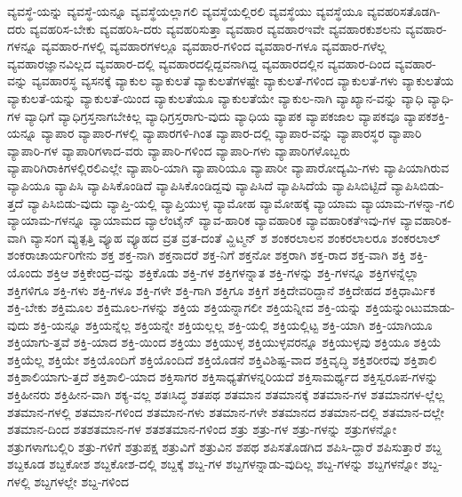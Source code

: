 {ವ್ಯವಸ್ಥೆ-ಯನ್ನು
ವ್ಯವಸ್ಥೆ-ಯನ್ನೂ
ವ್ಯವಸ್ಥೆಯಲ್ಲಾಗಲಿ
ವ್ಯವಸ್ಥೆಯಲ್ಲಿರಲಿ
ವ್ಯವಸ್ಥೆಯು
ವ್ಯವಸ್ಥೆಯೂ
ವ್ಯವಹರಿಸತೊಡಗಿ-ದರು
ವ್ಯವಹರಿಸ-ಬೇಕು
ವ್ಯವಹರಿಸಿ-ದರು
ವ್ಯವಹರಿಸುತ್ತಾ
ವ್ಯವಹಾರ
ವ್ಯವಹಾರಇವೇ
ವ್ಯವಹಾರಕುಶಲನು
ವ್ಯವಹಾರ-ಗಳನ್ನೂ
ವ್ಯವಹಾರ-ಗಳಲ್ಲಿ
ವ್ಯವಹಾರಗಳಲ್ಲೂ
ವ್ಯವಹಾರ-ಗಳಿಂದ
ವ್ಯವಹಾರ-ಗಳೂ
ವ್ಯವಹಾರ-ಗಳೆಲ್ಲ
ವ್ಯವಹಾರಜ್ಞಾನವಿಲ್ಲದ
ವ್ಯವಹಾರ-ದಲ್ಲಿ
ವ್ಯವಹಾರದಲ್ಲಿದ್ದವನಾಗಿದ್ದ
ವ್ಯವಹಾರದಲ್ಲಿನ
ವ್ಯವಹಾರ-ದಿಂದ
ವ್ಯವಹಾರ-ವನ್ನು
ವ್ಯವಹಾರಸ್ಥ
ವ್ಯಸನಕ್ಕೆ
ವ್ಯಾಕುಲ
ವ್ಯಾಕುಲತೆ
ವ್ಯಾಕುಲತೆಗಳಷ್ಟೇ
ವ್ಯಾಕುಲತೆ-ಗಳಿಂದ
ವ್ಯಾಕುಲತೆ-ಗಳು
ವ್ಯಾಕುಲತೆಯ
ವ್ಯಾಕುಲತೆ-ಯನ್ನು
ವ್ಯಾಕುಲತೆ-ಯಿಂದ
ವ್ಯಾಕುಲತೆಯೂ
ವ್ಯಾಕುಲತೆಯೇ
ವ್ಯಾಕುಲ-ನಾಗಿ
ವ್ಯಾಖ್ಯಾನ-ವನ್ನು
ವ್ಯಾಧಿ
ವ್ಯಾಧಿ-ಗಳ
ವ್ಯಾಧಿಗೆ
ವ್ಯಾಧಿಗ್ರಸ್ತನಾಗಬೇಕಿಲ್ಲ
ವ್ಯಾಧಿಗ್ರಸ್ತರಾಗು-ವುದು
ವ್ಯಾಧಿಯ
ವ್ಯಾಪಕ
ವ್ಯಾಪಕಜಾಲ
ವ್ಯಾಪಕವೂ
ವ್ಯಾಪಕಶಕ್ತಿ-ಯನ್ನೂ
ವ್ಯಾಪಾರ
ವ್ಯಾಪಾರ-ಗಳಲ್ಲಿ
ವ್ಯಾಪಾರಗಳಿ-ಗಿಂತ
ವ್ಯಾಪಾರ-ದಲ್ಲಿ
ವ್ಯಾಪಾರ-ವನ್ನು
ವ್ಯಾಪಾರಸ್ಥರ
ವ್ಯಾಪಾರಿ
ವ್ಯಾಪಾರಿ-ಗಳ
ವ್ಯಾಪಾರಿಗಳಾದ-ವರು
ವ್ಯಾಪಾರಿ-ಗಳಿಂದ
ವ್ಯಾಪಾರಿ-ಗಳು
ವ್ಯಾಪಾರಿಗಳೊಬ್ಬರು
ವ್ಯಾಪಾರಿಗಿರಾಕಿಗಳಲ್ಲಿರಲಿಎಲ್ಲೇ
ವ್ಯಾಪಾರಿ-ಯಾಗಿ
ವ್ಯಾಪಾರಿಯೂ
ವ್ಯಾಪಾರೀ
ವ್ಯಾಪಾರೋದ್ಯಮಿ-ಗಳು
ವ್ಯಾಪಿಯಾಗಿರುವ
ವ್ಯಾಪಿಯೂ
ವ್ಯಾಪಿಸಿ
ವ್ಯಾಪಿಸಿಕೊಂಡಿದೆ
ವ್ಯಾಪಿಸಿಕೊಂಡಿದ್ದವು
ವ್ಯಾಪಿಸಿದೆ
ವ್ಯಾಪಿಸಿದೆಯೆ
ವ್ಯಾಪಿಸಿಬಿಟ್ಟಿದೆ
ವ್ಯಾಪಿಸಿಬಿಡು-ತ್ತದೆ
ವ್ಯಾಪಿಸಿಬಿಡು-ವುದು
ವ್ಯಾಪ್ತಿ-ಯಲ್ಲಿ
ವ್ಯಾಪ್ತಿಯುಳ್ಳ
ವ್ಯಾಮೋಹ
ವ್ಯಾಮೋಹಕ್ಕೆ
ವ್ಯಾಯಾಮ
ವ್ಯಾಯಾಮ-ಗಳನ್ನಾ-ಗಲಿ
ವ್ಯಾಯಾಮ-ಗಳನ್ನೂ
ವ್ಯಾಯಾಮದ
ವ್ಯಾಲೆಂಟೈನ್
ವ್ಯಾವ-ಹಾರಿಕ
ವ್ಯಾವಹಾರಿಕ
ವ್ಯಾವಹಾರಿಕತೆಇವು-ಗಳ
ವ್ಯಾವಹಾರಿಕ-ವಾಗಿ
ವ್ಯಾಸಂಗ
ವ್ಯುತ್ಪತ್ತಿ
ವ್ಯೂಹ
ವ್ಯೂಹದ
ವ್ರತ
ವ್ರತ-ದಂತೆ
ವ್ಹಿಟ್ಮನ್
ಶ
ಶಂಕರಲಾಲನ
ಶಂಕರಲಾಲರೂ
ಶಂಕರಲಾಲ್
ಶಂಕರಾಚಾರ್ಯರಿಗೇನು
ಶಕ್ತ
ಶಕ್ತ-ನಾಗಿ
ಶಕ್ತನಾದರೆ
ಶಕ್ತ-ನಿಗೆ
ಶಕ್ತನೋ
ಶಕ್ತರಾಗಿ
ಶಕ್ತ-ರಾದ
ಶಕ್ತ-ವಾಗಿ
ಶಕ್ತಿ
ಶಕ್ತಿ-ಯೊಂದು
ಶಕ್ತಿಆ
ಶಕ್ತಿಕೇಂದ್ರ-ವನ್ನು
ಶಕ್ತಿಕೊಡು
ಶಕ್ತಿ-ಗಳ
ಶಕ್ತಿಗಳನ್ನಾತ
ಶಕ್ತಿ-ಗಳನ್ನು
ಶಕ್ತಿ-ಗಳನ್ನೂ
ಶಕ್ತಿಗಳನ್ನೆಲ್ಲಾ
ಶಕ್ತಿಗಳಿಗೂ
ಶಕ್ತಿ-ಗಳು
ಶಕ್ತಿ-ಗಳೂ
ಶಕ್ತಿ-ಗಳೇ
ಶಕ್ತಿ-ಗಾಗಿ
ಶಕ್ತಿಗೂ
ಶಕ್ತಿಗೆ
ಶಕ್ತಿದೇವರಿದ್ದಾನೆ
ಶಕ್ತಿದೇಹದ
ಶಕ್ತಿಧಾರ್ಮಿಕ
ಶಕ್ತಿ-ಬೇಕು
ಶಕ್ತಿಮೂಲ
ಶಕ್ತಿಮೂಲ-ಗಳನ್ನು
ಶಕ್ತಿಯ
ಶಕ್ತಿಯನ್ನಾಗಲೀ
ಶಕ್ತಿಯನ್ನೀವ
ಶಕ್ತಿ-ಯನ್ನು
ಶಕ್ತಿಯನ್ನುಂಟುಮಾಡು-ವುದು
ಶಕ್ತಿ-ಯನ್ನೂ
ಶಕ್ತಿಯನ್ನೆಲ್ಲ
ಶಕ್ತಿಯನ್ನೇ
ಶಕ್ತಿಯಲ್ಲಲ್ಲ
ಶಕ್ತಿ-ಯಲ್ಲಿ
ಶಕ್ತಿಯಲ್ಲಿಟ್ಟ
ಶಕ್ತಿ-ಯಾಗಿ
ಶಕ್ತಿ-ಯಾಗಿಯೂ
ಶಕ್ತಿಯಾಗು-ತ್ತವೆ
ಶಕ್ತಿ-ಯಾದ
ಶಕ್ತಿ-ಯಿಂದ
ಶಕ್ತಿಯು
ಶಕ್ತಿಯುಳ್ಳ
ಶಕ್ತಿಯುಳ್ಳವರನ್ನೂ
ಶಕ್ತಿಯುಳ್ಳವು
ಶಕ್ತಿಯೂ
ಶಕ್ತಿಯೆ
ಶಕ್ತಿಯೆಲ್ಲ
ಶಕ್ತಿಯೇ
ಶಕ್ತಿಯೊಂದಿಗೆ
ಶಕ್ತಿಯೊಂದಿದೆ
ಶಕ್ತಿಯೊಡನೆ
ಶಕ್ತಿವಿಶಿಷ್ಟ-ವಾದ
ಶಕ್ತಿವೃದ್ಧಿ
ಶಕ್ತಿಶರೀರವು
ಶಕ್ತಿಶಾಲಿ
ಶಕ್ತಿಶಾಲಿಯಾಗು-ತ್ತದೆ
ಶಕ್ತಿಶಾಲಿ-ಯಾದ
ಶಕ್ತಿಸಾಗರ
ಶಕ್ತಿಸಾಧ್ಯತೆಗಳನ್ನರಿಯದೆ
ಶಕ್ತಿಸಾಮರ್ಥ್ಯದ
ಶಕ್ತಿಸ್ವರೂಪ-ಗಳನ್ನು
ಶಕ್ತಿಹೀನರು
ಶಕ್ತಿಹೀನ-ವಾಗಿ
ಶಕ್ಯ-ವಲ್ಲ
ಶತಃಸಿದ್ಧ
ಶತಪಥ
ಶತಮಾನ
ಶತಮಾನಕ್ಕೆ
ಶತಮಾನ-ಗಳ
ಶತಮಾನಗಳ-ಲ್ಲೆಲ್ಲ
ಶತಮಾನ-ಗಳಲ್ಲಿ
ಶತಮಾನ-ಗಳಿಂದ
ಶತಮಾನ-ಗಳು
ಶತಮಾನ-ಗಳೇ
ಶತಮಾನದ
ಶತಮಾನ-ದಲ್ಲಿ
ಶತಮಾನ-ದಲ್ಲೇ
ಶತಮಾನ-ದಿಂದ
ಶತಶತಮಾನ-ಗಳ
ಶತಶತಮಾನ-ಗಳಿಂದ
ಶತ್ರು
ಶತ್ರು-ಗಳ
ಶತ್ರು-ಗಳನ್ನು
ಶತ್ರುಗಳನ್ನೋ
ಶತ್ರುಗಳಾಗಬಲ್ಲಿರಿ
ಶತ್ರು-ಗಳಿಗೆ
ಶತ್ರುಪಕ್ಷ
ಶತ್ರುವಿಗೆ
ಶತ್ರುವಿನ
ಶಪಥ
ಶಪಿಸತೊಡಗಿದ
ಶಪಿಸಿ-ದ್ದಾರೆ
ಶಪಿಸುತ್ತಾರೆ
ಶಬ್ದ
ಶಬ್ದಕೂಡ
ಶಬ್ದಕೋಶ
ಶಬ್ದಕೋಶ-ದಲ್ಲಿ
ಶಬ್ದಕ್ಕೆ
ಶಬ್ದ-ಗಳ
ಶಬ್ದಗಳನ್ನಾಡು-ವುದಿಲ್ಲ
ಶಬ್ದ-ಗಳನ್ನು
ಶಬ್ದಗಳನ್ನೋ
ಶಬ್ದ-ಗಳಲ್ಲಿ
ಶಬ್ದಗಳಲ್ಲೇ
ಶಬ್ದ-ಗಳಿಂದ
}

